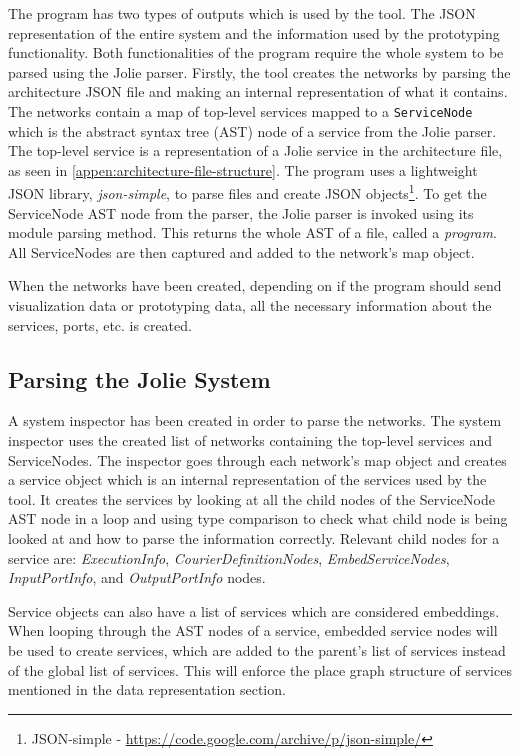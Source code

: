 The \javatoolname[] program has two types of outputs which is used by the tool. The JSON representation of the entire system and the information used by the prototyping functionality. Both functionalities of the \javatoolname[] program require the whole system to be parsed using the Jolie parser.
Firstly, the tool creates the networks by parsing the architecture JSON file and making an internal representation of what it contains. The networks contain a map of top-level services mapped to a \texttt{ServiceNode} which is the abstract syntax tree (AST) node of a service from the Jolie parser. The top-level service is a representation of a Jolie service in the architecture file, as seen in \cref{appen:architecture-file-structure}.
The \javatoolname[] program uses a lightweight JSON library, \textit{json-simple}, to parse files and create JSON objects\footnote{JSON-simple - \url{https://code.google.com/archive/p/json-simple/}}.
To get the ServiceNode AST node from the parser, the Jolie parser is invoked using its module parsing method. This returns the whole AST of a file, called a \textit{program}. All ServiceNodes are then captured and added to the network's map object.

When the networks have been created, depending on if the program should send visualization data or prototyping data, all the necessary information about the services, ports, etc. is created.
\subsection{Parsing the Jolie System}
A system inspector has been created in order to parse the networks.
The system inspector uses the created list of networks containing the top-level services and ServiceNodes.
The inspector goes through each network's map object and creates a service object which is an internal representation of the services used by the tool.
It creates the services by looking at all the child nodes of the ServiceNode AST node in a loop and using type comparison to check what child node is being looked at and how to parse the information correctly.
Relevant child nodes for a service are: \textit{ExecutionInfo}, \textit{CourierDefinitionNodes}, \textit{EmbedServiceNodes}, \textit{InputPortInfo}, and \textit{OutputPortInfo} nodes.

Service objects can also have a list of services which are considered embeddings. When looping through the AST nodes of a service, embedded service nodes will be used to create services, which are added to the parent's list of services instead of the global list of services.
This will enforce the place graph structure of services mentioned in the data representation section.

